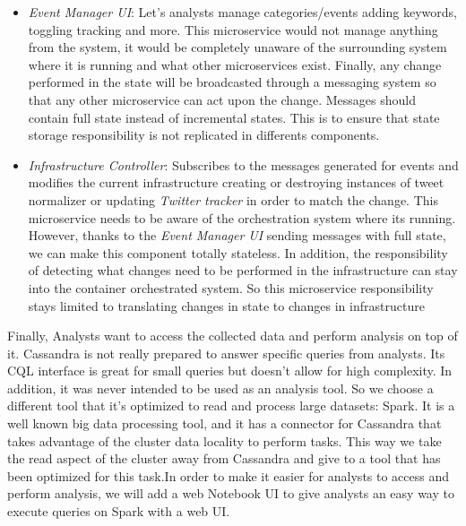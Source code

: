 \begin{itemize}
	\item \textit{Event Manager UI}: Let’s analysts manage categories/events adding keywords, toggling tracking and more. This microservice would not manage anything from the system, it would be completely unaware of the surrounding system where it is running and what other microservices exist. Finally, any change performed in the state will be broadcasted through a messaging system so that any other microservice can act upon the change. Messages should contain full state instead of incremental states. This is to ensure that state storage responsibility is not replicated in differents components. 
	\item \textit{Infrastructure Controller}:  Subscribes to the messages generated for events and modifies the current infrastructure creating or destroying instances of tweet normalizer or updating \textit{Twitter tracker}  in order to match the change. This microservice needs to be aware of the orchestration system where its running. However, thanks to the \textit{Event Manager UI} sending messages with full state, we can make this component totally stateless. In addition, the responsibility of detecting what changes need to be performed in the infrastructure can stay into the container orchestrated system. So this microservice responsibility stays limited to translating changes in state to changes in infrastructure

\end{itemize}

Finally, Analysts want to access the collected data and perform analysis on top of it. Cassandra is not really prepared to answer specific queries from analysts. Its CQL interface is great for small queries but doesn’t allow for high complexity. In addition, it was never intended to be used as an analysis tool. So we choose a different tool that it's optimized to read and process large datasets: Spark. It is a well known big data processing tool, and it has a connector for Cassandra that takes advantage of the cluster data locality to perform tasks. This way we take the read aspect of the cluster away from Cassandra and give to a tool that has been optimized for this task.In order to make it easier for analysts to access and perform analysis, we will add a web Notebook UI to give analysts an easy way to execute queries on Spark with a web UI.

